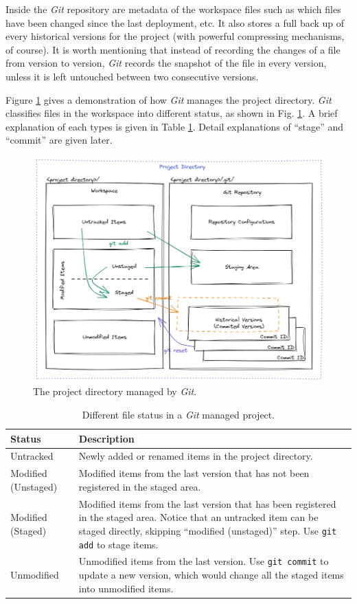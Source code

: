 Inside the \textit{Git} repository are metadata of the workspace files such as which files have been changed since the last deployment, etc. It also stores a full back up of every historical versions for the project (with powerful compressing mechanisms, of course). It is worth mentioning that instead of recording the changes of a file from version to version, \textit{Git} records the snapshot of the file in every version, unless it is left untouched between two consecutive versions.

Figure \ref{ch:sma:fig:gitbasics} gives a demonstration of how \textit{Git} manages the project directory. \textit{Git} classifies files in the workspace into different status, as shown in Fig. \ref{ch:sma:fig:gitbasics}. A brief explanation of each types is given in Table \ref{ch:sma:tab:gitbasics}. Detail explanations of ``stage'' and ``commit'' are given later.
\begin{figure}
	\centering
	\includegraphics[width=350pt]{chapters/ch-software-management-advanced/figures/gitbasics.png}
	\caption{The project directory managed by \textit{Git}.} \label{ch:sma:fig:gitbasics}
\end{figure}

\begin{table}
	\centering \caption{Different file status in a \textit{Git} managed project.}\label{ch:sma:tab:gitbasics}
	\begin{tabularx}{\textwidth}{lX}
		\hline
		Status & Description \\ \hline
		Untracked & Newly added or renamed items in the project directory.  \\ \hdashline
		Modified (Unstaged) & Modified items from the last version that has not been registered in the staged area.  \\ \hdashline
		Modified (Staged) & Modified items from the last version that has been registered in the staged area. Notice that an untracked item can be staged directly, skipping ``modified (unstaged)'' step. Use \verb|git add| to stage items. \\ \hdashline
		Unmodified & Unmodified items from the last version. Use \verb|git commit| to update a new version, which would change all the staged items into unmodified items. \\ \hline
	\end{tabularx}
\end{table}


